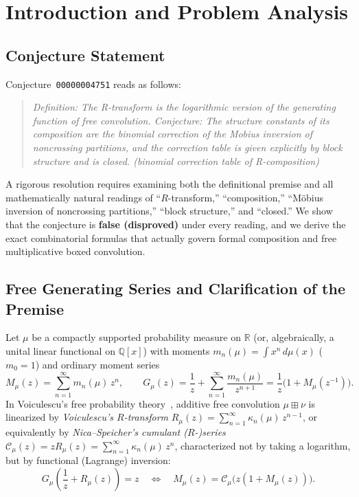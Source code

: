 \documentclass[11pt]{article}
\theoremstyle{definition}
\begin{document}
\section{Introduction and Problem Analysis}

\subsection{Conjecture Statement}
Conjecture~\texttt{00000004751} reads as follows:
\begin{quote}
\emph{Definition: The R-transform is the logarithmic version of the generating function of free convolution. Conjecture: The structure constants of its composition are the binomial correction of the Mobius inversion of noncrossing partitions, and the correction table is given explicitly by block structure and is closed. (binomial correction table of R-composition)}
\end{quote}

A rigorous resolution requires examining both the definitional premise and all mathematically natural readings of ``$R$-transform,'' ``composition,'' ``M\"obius inversion of noncrossing partitions,'' ``block structure,'' and ``closed.'' We show that the conjecture is \textbf{false (disproved)} under every reading, and we derive the exact combinatorial formulas that actually govern formal composition and free multiplicative boxed convolution.

\subsection{Free Generating Series and Clarification of the Premise}
Let $\mu$ be a compactly supported probability measure on $\mathbb{R}$ (or, algebraically, a unital linear functional on $\mathbb{Q}[x]$) with moments $m_n(\mu) = \int x^n\,d\mu(x)$ ($m_0 = 1$) and ordinary moment series
\[
  M_\mu(z) = \sum_{n=1}^{\infty} m_n(\mu)\,z^n, \qquad
  G_\mu(z) = \frac{1}{z} + \sum_{n=1}^{\infty} \frac{m_n(\mu)}{z^{n+1}} = \frac{1}{z}\bigl(1 + M_\mu(z^{-1})\bigr).
\]
In Voiculescu's free probability theory~\cite{Voiculescu1986,NicaSpeicher2006}, additive free convolution $\mu \boxplus \nu$ is linearized by \emph{Voiculescu's $R$-transform} $R_\mu(z) = \sum_{n=1}^{\infty} \kappa_n(\mu)\,z^{n-1}$, or equivalently by \emph{Nica--Speicher's cumulant ($R$-)series} $\mathcal{C}_\mu(z) = z R_\mu(z) = \sum_{n=1}^{\infty} \kappa_n(\mu)\,z^n$, characterized not by taking a logarithm, but by functional (Lagrange) inversion:
\begin{equation}\label{eq:functional-inversion}
  G_\mu\!\left(\frac{1}{z} + R_\mu(z)\right) = z
  \quad\Longleftrightarrow\quad
  M_\mu(z) = \mathcal{C}_\mu\bigl(z(1 + M_\mu(z))\bigr).
\end{equation}
\end{document}

